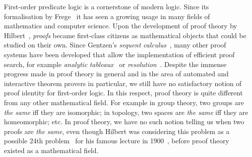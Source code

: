 \documentclass[conference,twosided,10pt]{IEEEtran}
\theoremstyle{definition}
\begin{document}
First-order predicate logic is a cornerstone of modern
logic. Since its formalisation by Frege~\cite{frege:79} it has seen a
growing usage in many fields of mathematics and computer science. Upon
the development of proof theory by Hilbert~\cite{hilbert:22},
\emph{proofs} became first-class citizens as mathematical objects that
could be studied on their own. Since Gentzen's \emph{sequent
calculus}~\cite{gentzen:35:I,gentzen:35:II}, many other proof systems
have been developed that allow the implementation of efficient proof
search, for example \emph{analytic tableaux}~\cite{smullyan:68} or
\emph{resolution}~\cite{robinson:65}. Despite the immense progress
made in proof theory in general and in the area of
automated and interactive theorem provers in
particular, we still have
no satisfactory notion of proof identity for first-order logic. In
this respect, proof theory is quite different from any other
mathematical field. For example in group theory, two groups are
\emph{the same} iff they are isomorphic; in topology, two spaces are
\emph{the same} iff they are homeomorphic; etc. In proof theory, we
have no such notion telling us when two proofs are \emph{the same},
even though Hilbert was considering this problem as a possible 24th
problem~\cite{thiele:03} for his famous lecture in
1900~\cite{hilbert:00}, before proof theory existed as a mathematical
field.
\end{document}
